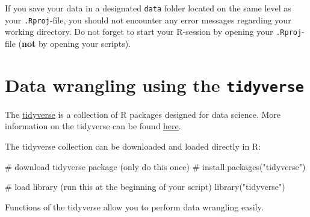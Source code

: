 \documentclass[
  letterpaper,
  DIV=11,
  numbers=noendperiod]{scrreprt}
\newenvironment{Shaded}{\begin{snugshade}}{\end{snugshade}}
\newcommand{\CommentTok}[1]{\textcolor[rgb]{0.37,0.37,0.37}{#1}}
\newcommand{\FunctionTok}[1]{\textcolor[rgb]{0.28,0.35,0.67}{#1}}
\newcommand{\NormalTok}[1]{\textcolor[rgb]{0.00,0.23,0.31}{#1}}
\newcommand{\StringTok}[1]{\textcolor[rgb]{0.13,0.47,0.30}{#1}}
\begin{document}
\begin{tcolorbox}[enhanced jigsaw, opacityback=0, left=2mm, colback=white, breakable, toprule=.15mm, colframe=quarto-callout-important-color-frame, leftrule=.75mm, arc=.35mm, rightrule=.15mm, bottomrule=.15mm]
\begin{minipage}[t]{5.5mm}
\textcolor{quarto-callout-important-color}{\faExclamation}
\end{minipage}%
\begin{minipage}[t]{\textwidth - 5.5mm}

If you save your data in a designated \texttt{data} folder located on
the same level as your \texttt{.Rproj}-file, you should not encounter
any error messages regarding your working directory. Do not forget to
start your R-session by opening your \texttt{.Rproj}-file (\textbf{not}
by opening your scripts).

\end{minipage}%
\end{tcolorbox}


\hypertarget{data-wrangling-using-the-tidyverse}{%
\chapter{\texorpdfstring{Data wrangling using the
\texttt{tidyverse}}{Data wrangling using the tidyverse}}\label{data-wrangling-using-the-tidyverse}}

\hfill\break

The \href{https://www.tidyverse.org/}{tidyverse} is a collection of R
packages designed for data science. More information on the tidyverse
can be found \href{https://r4ds.had.co.nz/}{here}.

The tidyverse collection can be downloaded and loaded directly in R:

\begin{Shaded}
\begin{Highlighting}[]
\CommentTok{\# download tidyverse package (only do this once)}
\CommentTok{\# install.packages("tidyverse") }

\CommentTok{\# load library (run this at the beginning of your script)}
\FunctionTok{library}\NormalTok{(}\StringTok{"tidyverse"}\NormalTok{) }
\end{Highlighting}
\end{Shaded}

Functions of the tidyverse allow you to perform data wrangling easily.
\end{document}
